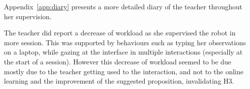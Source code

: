 Appendix~\ref{app:diary} presents a more detailed diary of the teacher throughout her supervision.

The teacher did report a decrease of workload as she supervised the robot in more session. This was supported by behaviours such as typing her observations on a laptop, while gazing at the interface in multiple interactions (especially at the start of a session). However this decrease of workload seemed to be due mostly due to the teacher getting used to the interaction, and not to the online learning and the improvement of the suggested proposition, invalidating H3.
%
%
%
%

